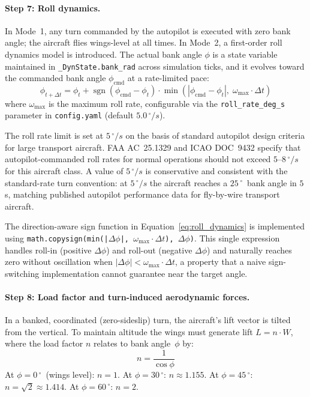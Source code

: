 \paragraph{Step 7: Roll dynamics.}
\label{sec:mode2_roll}

In Mode~1, any turn commanded by the autopilot is executed with zero bank angle; the aircraft flies wings-level at all times.  In Mode~2, a first-order roll dynamics model is introduced.  The actual bank angle $\phi$ is a state variable maintained in \texttt{\_DynState.bank\_rad} across simulation ticks, and it evolves toward the commanded bank angle $\phi_{\text{cmd}}$ at a rate-limited pace:
\begin{equation}
    \phi_{t+\Delta t} = \phi_t + \operatorname{sgn}(\phi_{\text{cmd}} - \phi_t) \cdot \min\!\left(|\phi_{\text{cmd}} - \phi_t|,\; \omega_{\max} \cdot \Delta t\right)
    \label{eq:roll_dynamics}
\end{equation}
where $\omega_{\max}$ is the maximum roll rate, configurable via the \texttt{roll\_rate\_deg\_s} parameter in \texttt{config.yaml} (default $5.0$\,$^\circ/s$).

The roll rate limit is set at $5$\,$^\circ/s$ on the basis of standard autopilot design criteria for large transport aircraft.  FAA AC~25.1329 and ICAO DOC~9432 specify that autopilot-commanded roll rates for normal operations should not exceed $5$--$8$\,$^\circ/s$ for this aircraft class.  A value of $5$\,$^\circ/s$ is conservative and consistent with the standard-rate turn convention: at $5$\,$^\circ/s$ the aircraft reaches a $25$\,$^\circ$\ bank angle in $5$\,s, matching published autopilot performance data for fly-by-wire transport aircraft.

The direction-aware sign function in Equation~\ref{eq:roll_dynamics} is implemented using \texttt{math.copysign(min(|$\Delta\phi$|, $\omega_{\max} \cdot \Delta t$), $\Delta\phi$)}.  This single expression handles roll-in (positive $\Delta\phi$) and roll-out (negative $\Delta\phi$) and naturally reaches zero without oscillation when $|\Delta\phi| < \omega_{\max} \cdot \Delta t$, a property that a naive sign-switching implementation cannot guarantee near the target angle.

\paragraph{Step 8: Load factor and turn-induced aerodynamic forces.}
\label{sec:mode2_forces}

In a banked, coordinated (zero-sideslip) turn, the aircraft's lift vector is tilted from the vertical.  To maintain altitude the wings must generate lift $L = n \cdot W$, where the load factor $n$ relates to bank angle~$\phi$ by:
\begin{equation}
    n = \frac{1}{\cos\phi}
    \label{eq:load_factor}
\end{equation}
At $\phi = 0$\,$^\circ$\ (wings level): $n = 1$.  At $\phi = 30$\,$^\circ$: $n \approx 1.155$.  At $\phi = 45$\,$^\circ$: $n = \sqrt{2} \approx 1.414$.  At $\phi = 60$\,$^\circ$: $n = 2$.

